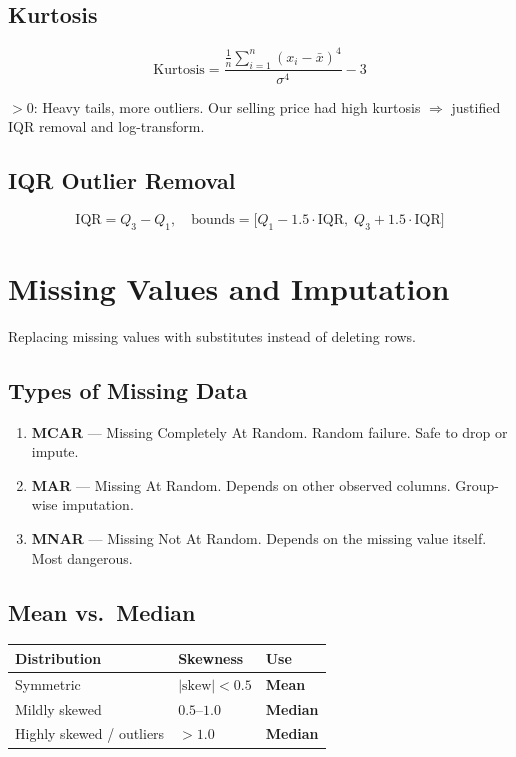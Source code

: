 \documentclass[12pt,a4paper]{article}
\begin{document}
\subsection{Kurtosis}
\begin{formulabox}
\[\text{Kurtosis}=\frac{\frac{1}{n}\sum_{i=1}^{n}(x_i-\bar{x})^4}{\sigma^4}-3\]
\end{formulabox}
$>0$: Heavy tails, more outliers. Our selling price had high kurtosis $\Rightarrow$ justified IQR removal and log-transform.

\subsection{IQR Outlier Removal}
\begin{formulabox}
\[\text{IQR}=Q_3-Q_1,\quad\text{bounds}=\bigl[Q_1-1.5\cdot\text{IQR},\;Q_3+1.5\cdot\text{IQR}\bigr]\]
\end{formulabox}

\section{Missing Values and Imputation}

\begin{definitionbox}[Imputation]
Replacing missing values with substitutes instead of deleting rows.
\end{definitionbox}

\subsection{Types of Missing Data}
\begin{enumerate}
  \item \textbf{MCAR} — Missing Completely At Random. Random failure. Safe to drop or impute.
  \item \textbf{MAR} — Missing At Random. Depends on other observed columns. Group-wise imputation.
  \item \textbf{MNAR} — Missing Not At Random. Depends on the missing value itself. Most dangerous.
\end{enumerate}

\subsection{Mean vs.\ Median}
\begin{center}
\begin{tabular}{lll}\toprule
  Distribution & Skewness & Use\\\midrule
  Symmetric & $|\text{skew}|<0.5$ & \textbf{Mean}\\
  Mildly skewed & $0.5$--$1.0$ & \textbf{Median}\\
  Highly skewed / outliers & $>1.0$ & \textbf{Median}\\\bottomrule
\end{tabular}
\end{center}
\end{document}
